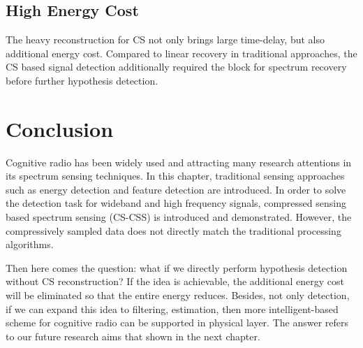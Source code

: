 \subsection{High Energy Cost}
The heavy reconstruction for CS not only brings large time-delay, but also additional energy cost. Compared to linear recovery in traditional approaches, the CS based signal detection additionally required the block for spectrum recovery before further hypothesis detection. 

\section{Conclusion}
Cognitive radio has been widely used and attracting many research attentions in its spectrum sensing techniques. In this chapter, traditional sensing approaches such as energy detection and feature detection are introduced. In order to solve the detection task for wideband and high frequency signals, compressed sensing based spectrum sensing (CS-CSS) is introduced and demonstrated. However, the compressively sampled data does not directly match the traditional processing algorithms.

Then here comes the question: what if we directly perform hypothesis detection without CS reconstruction? If the idea is achievable, the additional energy cost will be eliminated so that the entire energy reduces. Besides, not only detection, if we can expand this idea to filtering, estimation, then more intelligent-based scheme for cognitive radio can be supported in physical layer. The answer refers to our future research aims that shown in the next chapter.




